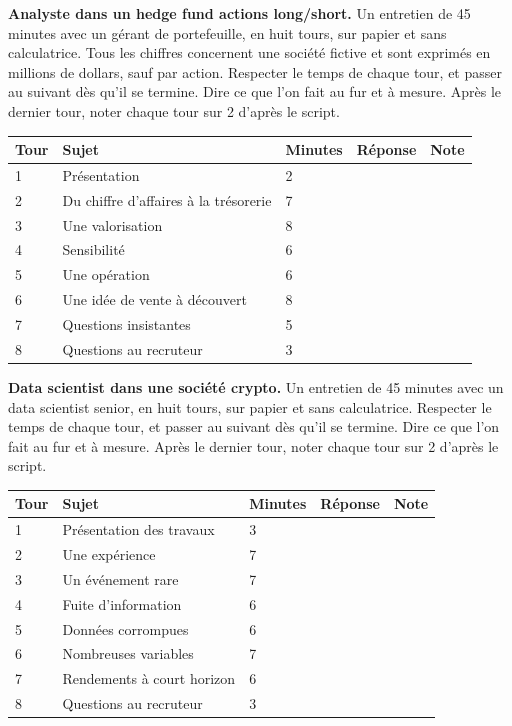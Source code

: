 \vfill\clearpage
\begin{question}\label{iq:iv2:mock-interviews:4}
\textbf{Analyste dans un hedge fund actions long/short.} Un entretien de 45 minutes avec un gérant de portefeuille, en huit tours, sur papier et sans calculatrice. Tous les chiffres concernent une société fictive et sont exprimés en millions de dollars, sauf par action. Respecter le temps de chaque tour, et passer au suivant dès qu'il se termine. Dire ce que l'on fait au fur et à mesure. Après le dernier tour, noter chaque tour sur 2 d'après le script.

\medskip
\begin{tabular}{@{}l|l|l|l|l@{}}
Tour & Sujet & Minutes & Réponse & Note \\ \hline
1 & Présentation & 2 & & \\[6pt]\hline
2 & Du chiffre d'affaires à la trésorerie & 7 & & \\[6pt]\hline
3 & Une valorisation & 8 & & \\[6pt]\hline
4 & Sensibilité & 6 & & \\[6pt]\hline
5 & Une opération & 6 & & \\[6pt]\hline
6 & Une idée de vente à découvert & 8 & & \\[6pt]\hline
7 & Questions insistantes & 5 & & \\[6pt]\hline
8 & Questions au recruteur & 3 & & \\[6pt]\hline
\end{tabular}
\end{question}

\vfill\clearpage
\begin{question}\label{iq:iv2:mock-interviews:5}
\textbf{Data scientist dans une société crypto.} Un entretien de 45 minutes avec un data scientist senior, en huit tours, sur papier et sans calculatrice. Respecter le temps de chaque tour, et passer au suivant dès qu'il se termine. Dire ce que l'on fait au fur et à mesure. Après le dernier tour, noter chaque tour sur 2 d'après le script.

\medskip
\begin{tabular}{@{}l|l|l|l|l@{}}
Tour & Sujet & Minutes & Réponse & Note \\ \hline
1 & Présentation des travaux & 3 & & \\[6pt]\hline
2 & Une expérience & 7 & & \\[6pt]\hline
3 & Un événement rare & 7 & & \\[6pt]\hline
4 & Fuite d'information & 6 & & \\[6pt]\hline
5 & Données corrompues & 6 & & \\[6pt]\hline
6 & Nombreuses variables & 7 & & \\[6pt]\hline
7 & Rendements à court horizon & 6 & & \\[6pt]\hline
8 & Questions au recruteur & 3 & & \\[6pt]\hline
\end{tabular}
\end{question}

